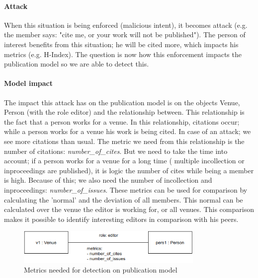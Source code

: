 \documentclass{ou-report}
\begin{document}
\paragraph{Attack} When this situation is being enforced (malicious intent), it 
becomes attack (e.g. the member says: "cite me, or your work will not be 
published"). The person of interest benefits 
from this situation; he will be cited more, which impacts his metrics (e.g. 
H-Index). The question is now how this enforcement impacts the 
publication model so we are able to detect this. 

\paragraph{Model impact}
The impact this attack has on the publication model is on the objects Venue, 
Person (with the role editor) and the relationship between. This relationship is 
the fact that a person works for a venue. In this relationship, citations occur; 
while a person works for a venue his work is being cited. In case of an attack; 
we see more citations than usual. The metric we need from this 
relationship is the number of citations: \textit{number\_of\_cites}. But we need 
to take the time into account; if a person works for a venue for a long time (
multiple incollection or inproceedings are published), it is logic the number of 
cites while being a member is high. Because of this; we also need the number 
of incollection and inproceedings: \textit{number\_of\_issues}.
These metrics can be used for comparison by calculating the 'normal' and the 
deviation of all members. This normal can be calculated over the venue the 
editor is working for, or all venues. This comparison makes it possible to 
identify interesting editors in comparison with his peers.

\begin{figure}[H]
\centering
\includegraphics[width=9cm]{images/cite_work_editorial_boardmodel_impact.drawio.png}
\caption{Metrics needed for detection on publication model}
\label{fig:cwebimpact}
\end{figure}
\end{document}
